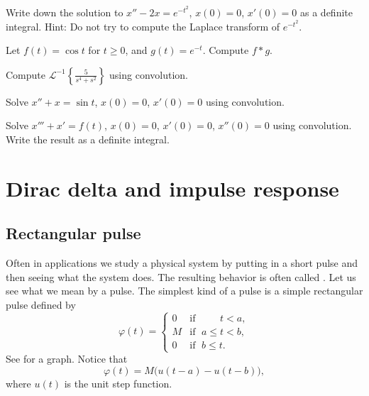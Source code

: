 \documentclass[12pt]{book}
\begin{document}
\begin{exercise}
Write down the solution to
$x''-2x=e^{-t^2}$, $x(0)=0$, $x'(0)=0$ as a
definite integral.  Hint: Do not try to compute the
Laplace transform of $e^{-t^2}$.
\end{exercise}

\setcounter{exercise}{100}

\begin{exercise}
Let $f(t) = \cos t$ for $t \geq 0$, and $g(t) = e^{-t}$.  Compute
$f * g$.
\end{exercise}

\begin{exercise}
Compute ${\mathcal{L}}^{-1} \left\{ \frac{5}{s^4+s^2} \right\}$ using
convolution.
\end{exercise}


\begin{exercise}
Solve $x''+x = \sin t$, $x(0) = 0$, $x'(0)=0$ using convolution.
\end{exercise}

\begin{exercise}
Solve $x'''+x' = f(t)$, $x(0) = 0$, $x'(0)=0$, $x''(0)=0$ using convolution.
Write the result as a definite integral.
\end{exercise}



\sectionnewpage
\section{Dirac delta and impulse response}


\subsection{Rectangular pulse}

Often in applications we study a physical system by putting in a short pulse 
and then seeing what the system does.  The resulting behavior is
often called \emph{}.
Let us see what we mean by a pulse.
The simplest kind of a pulse is a simple rectangular pulse defined by
\begin{equation*}
\varphi(t) = 
\begin{cases}
0 & \text{if } \; \phantom{a \leq {}} t < a , \\
M & \text{if } \; a \leq t < b , \\
0 & \text{if } \; b \leq t .
\end{cases}
\end{equation*}
See  for a graph.
Notice that
\begin{equation*}
\varphi(t) = M \bigl( u(t-a) - u(t-b) \bigr) ,
\end{equation*}
where $u(t)$ is the unit step function.
\end{document}
